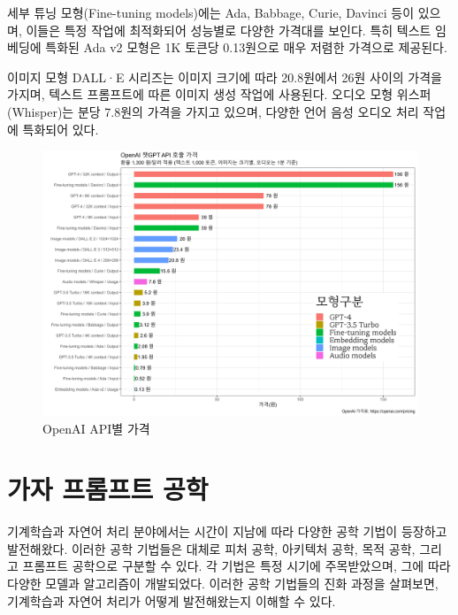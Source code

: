 \documentclass[
  letterpaper,
]{book}
\begin{document}
세부 튜닝 모형(Fine-tuning models)에는 Ada, Babbage, Curie, Davinci 등이
있으며, 이들은 특정 작업에 최적화되어 성능별로 다양한 가격대를 보인다.
특히 텍스트 임베딩에 특화된 Ada v2 모형은 1K 토큰당 0.13원으로 매우
저렴한 가격으로 제공된다.

이미지 모형 DALL·E 시리즈는 이미지 크기에 따라 20.8원에서 26원 사이의
가격을 가지며, 텍스트 프롬프트에 따른 이미지 생성 작업에 사용된다.
오디오 모형 위스퍼(Whisper)는 분당 7.8원의 가격을 가지고 있으며, 다양한
언어 음성 오디오 처리 작업에 특화되어 있다.

\begin{figure}

{\centering \includegraphics{images/pricing_20230621_g.png}

}

\caption{OpenAI API별 가격}

\end{figure}

\hypertarget{uxac00uxc790-uxd504uxb86cuxd504uxd2b8-uxacf5uxd559}{%
\section{가자 프롬프트
공학}\label{uxac00uxc790-uxd504uxb86cuxd504uxd2b8-uxacf5uxd559}}

기계학습과 자연어 처리 분야에서는 시간이 지남에 따라 다양한 공학 기법이
등장하고 발전해왔다. 이러한 공학 기법들은 대체로 피처 공학, 아키텍처
공학, 목적 공학, 그리고 프롬프트 공학으로 구분할 수 있다. 각 기법은 특정
시기에 주목받았으며, 그에 따라 다양한 모델과 알고리즘이 개발되었다.
이러한 공학 기법들의 진화 과정을 살펴보면, 기계학습과 자연어 처리가
어떻게 발전해왔는지 이해할 수 있다.
\end{document}
